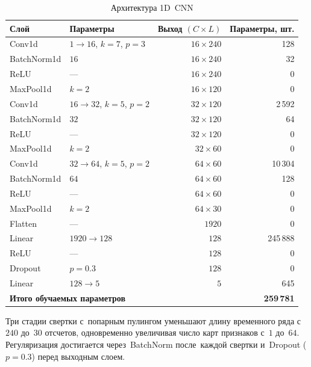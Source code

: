 \begin{table}[h]
\centering
\caption{Архитектура 1D~CNN}
\label{tab:cnn_arch}
\begin{tabular}{llrr}
\hline
\textbf{Слой} & \textbf{Параметры} &
\textbf{Выход $(C \times L)$} & \textbf{Параметры, шт.} \\
\hline
Conv1d       & $1\to16$, $k=7$, $p=3$ & $16\times240$ & 128  \\
BatchNorm1d  & $16$                   & $16\times240$ & 32   \\
ReLU         & ---                    & $16\times240$ & 0    \\
MaxPool1d    & $k=2$                  & $16\times120$ & 0    \\
\hline
Conv1d       & $16\to32$, $k=5$, $p=2$ & $32\times120$ & 2\,592 \\
BatchNorm1d  & $32$                    & $32\times120$ & 64    \\
ReLU         & ---                     & $32\times120$ & 0     \\
MaxPool1d    & $k=2$                   & $32\times60$  & 0     \\
\hline
Conv1d       & $32\to64$, $k=5$, $p=2$ & $64\times60$ & 10\,304 \\
BatchNorm1d  & $64$                     & $64\times60$ & 128     \\
ReLU         & ---                      & $64\times60$ & 0       \\
MaxPool1d    & $k=2$                    & $64\times30$ & 0       \\
\hline
Flatten      & ---                      & $1920$       & 0       \\
Linear       & $1920\to128$             & $128$        & 245\,888 \\
ReLU         & ---                      & $128$        & 0        \\
Dropout      & $p=0.3$                  & $128$        & 0        \\
Linear       & $128\to5$                & $5$          & 645      \\
\hline
\multicolumn{3}{l}{\textbf{Итого обучаемых параметров}} & \textbf{259\,781} \\
\hline
\end{tabular}
\end{table}

Три стадии свертки с~попарным пулингом уменьшают длину
временного ряда с~$240$ до~$30$ отсчетов, одновременно
увеличивая число карт признаков с~$1$ до~$64$.
Регуляризация достигается через~BatchNorm после~каждой свертки
и~Dropout ($p=0.3$) перед выходным слоем.

